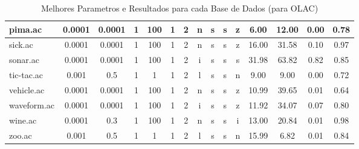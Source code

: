 \begin{table}[htbp]
\begin{tabular}{|l|c|c|c|c|c|c|c|c|c|c||c|c|c|c|}
		\hline
		pima.ac        & 0.0001   & 0.0001      & 1              & 100                 & 1             & 2        & n             & s      & s        & z        & 6.00           & 12.00          & 0.00           & 0.78           \\
		\hline
		sick.ac        & 0.0001   & 0.0001      & 1              & 100                 & 1             & 2        & n             & s      & s        & z        & 16.00          & 31.58          & 0.10           & 0.97           \\
		\hline
		sonar.ac       & 0.0001   & 0.0001      & 1              & 100                 & 1             & 2        & i             & s      & s        & s        & 31.98          & 63.82          & 0.82           & 0.85           \\
		\hline
		tic-tac.ac     & 0.001    & 0.5         & 1              & 1                   & 1             & 2        & l             & s      & s        & n        & 9.00           & 9.00           & 0.00           & 0.72           \\
		\hline
		vehicle.ac     & 0.0001   & 0.0001      & 1              & 100                 & 1             & 2        & n             & s      & s        & z        & 10.99          & 39.65          & 0.01           & 0.64           \\
		\hline
		waveform.ac    & 0.0001   & 0.0001      & 1              & 100                 & 1             & 2        & i             & s      & s        & z        & 11.92          & 34.07          & 0.07           & 0.80           \\
		\hline
		wine.ac        & 0.0001   & 0.3         & 1              & 100                 & 1             & 2        & n             & s      & s        & i        & 13.00          & 20.84          & 0.01           & 0.98           \\
		\hline
		zoo.ac         & 0.001    & 0.5         & 1              & 1                   & 1             & 2        & l             & s      & s        & n        & 15.99          & 6.82           & 0.01           & 0.84           \\
		\hline
		\end{tabular}
	\caption{Melhores Parametros e Resultados para cada Base de Dados (para OLAC)}
	\label{tab:best_runs_for_each_db_olac}
\end{table}